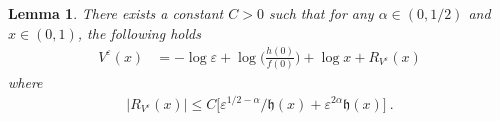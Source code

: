 \documentclass[reqno, 12pt, a4paper]{amsart}
\theoremstyle{plain}
\newtheorem{lemma}[theorem]{Lemma}
\theoremstyle{definition}
\begin{document}
\begin{lemma}
\label{lem:expV}
There exists a constant $C>0$ such that for any $\alpha \in (0,1/2)$ and $x\in (0,1)$, the following holds
\begin{equation}
\label{eq:exp-Vvarepsilon}
\begin{split}
V^\varepsilon(x) &= - \log \varepsilon +  \log \Big(\frac{h(0)}{f(0)} \Big)  +  \log x + R_{V^\varepsilon} (x) 
\end{split}
\end{equation}
where 
\begin{equation}
\begin{split}
\vert R_{V^\varepsilon} (x) \vert \le C \big[ \varepsilon^{1/2 - \alpha}/{\mathfrak  h}(x) + \varepsilon^{2\alpha} {\mathfrak h}(x)  \big] \ .
\end{split}
\end{equation}
\end{lemma}
\end{document}
